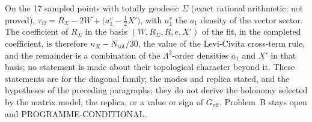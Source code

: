On the 17 sampled points with totally geodesic \(\Sigma\) (exact rational arithmetic; not proved), \(\tau_\Omega=R_\Sigma-2W+\bigl(a_1^{v}-\tfrac12X'\bigr)\), with \(a_1^{v}\) the \(a_1\) density of the vector sector. The coefficient of \(R_\Sigma\) in the basis \((W,R_\Sigma,R,e,X')\) of the fit, in the completed coefficient, is therefore \(\kappa_X-N_{\mathrm{tot}}/30\), the value of the Levi-Civita cross-term rule, and the remainder is a combination of the \(\Lambda^2\)-order densities \(a_1\) and \(X'\) in that basis; no statement is made about their topological character beyond it. These statements are for the diagonal family, the modes and replica stated, and the hypotheses of the preceding paragraphs; they do not derive the holonomy selected by the matrix model, the replica, or a value or sign of \(G_{\mathrm{eff}}\). Problem~B stays open and PROGRAMME-CONDITIONAL.
